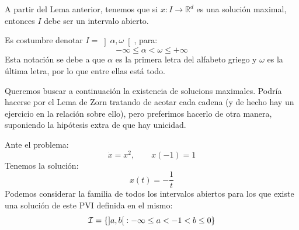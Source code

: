 \noindent
A partir del Lema anterior, tenemos que si $x:I\to \mathbb{R}^d$ es una solución maximal, entonces $I$ debe ser un intervalo abierto. 

\begin{notacion}
    Es costumbre denotar $I = \left]\alpha,\omega\right[$, para:
    \begin{equation*}
        -\infty \leq \alpha < \omega \leq +\infty
    \end{equation*}
    Esta notación se debe a que $\alpha$ es la primera letra del alfabeto griego y $\omega$ es la última letra, por lo que entre ellas está todo.
\end{notacion}

\noindent
Queremos buscar a continuación la existencia de solucions maximales. Podría hacerse por el Lema de Zorn tratando de acotar cada cadena (y de hecho hay un ejercicio en la relación sobre ello), pero preferimos hacerlo de otra manera, suponiendo la hipótesis extra de que hay unicidad. %

\begin{ejemplo}
    Ante el problema:
    \begin{equation*}
        \dot{x} = x^2, \qquad x(-1) = 1
    \end{equation*}
    Tenemos la solución:
    \begin{equation*}
        x(t) = -\frac{1}{t}
    \end{equation*}
    Podemos considerar la familia de todos los intervalos abiertos para los que existe una solución de este PVI definida en el mismo:
    \begin{equation*}
        \mathcal{I} = \{\left]a,b\right[:-\infty\leq a<-1 <b\leq 0\}
    \end{equation*}
\end{ejemplo}


